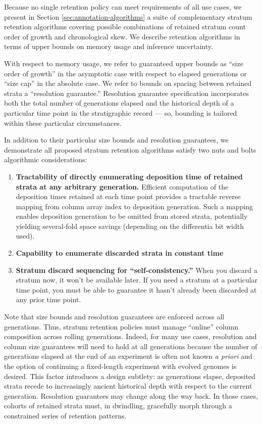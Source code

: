 Because no single retention policy can meet requirements of all use cases, we present in Section \ref{sec:annotation-algorithms} a suite of complementary stratum retention algorithms covering possible combinations of retained stratum count order of growth and chronological skew.
We describe retention algorithms in terms of upper bounds on memory usage and inference uncertainty.

With respect to memory usage, we refer to guaranteed upper bounds as ``size order of growth'' in the asymptotic case with respect to elapsed generations or ``size cap'' in the absolute case.
We refer to bounds on spacing between retained strata a ``resolution guarantee.''
Resolution guarantee specification incorporates both the total number of generations elapsed and the historical depth of a particular time point in the stratigraphic record --- so, bounding is tailored within these particular circumstances.

In addition to their particular size bounds and resolution guarantees, we demonstrate all proposed stratum retention algorithms satisfy two nuts and bolts algorithmic considerations:
\begin{enumerate}
\item \textbf{Tractability of directly enumerating deposition time of retained strata at any arbitrary generation.} Efficient computation of the deposition times retained at each time point provides a tractable reverse mapping from column array index to deposition generation.
  Such a mapping enables deposition generation to be omitted from stored strata, potentially yielding several-fold space savings (depending on the differentia bit width used).

\item \textbf{Capability to enumerate discarded strata in constant time}

\item \textbf{Stratum discard sequencing for ``self-consistency.''}
  When you discard a stratum now, it won't be available later.
  If you need a stratum at a particular time point, you must be able to guarantee it hasn't already been discarded at any prior time point.

\end{enumerate}

Note that size bounds and resolution guarantees are enforced across all generations.
Thus, stratum retention policies must manage ``online'' column composition across rolling generations.
Indeed, for many use cases, resolution and column size guarantees will need to hold at all generations because the number of generations elapsed at the end of an experiment is often not known \textit{a priori} and the option of continuing a fixed-length experiment with evolved genomes is desired.
This factor introduces a design subtlety: as generations elapse, deposited strata recede to increasingly ancient historical depth with respect to the current generation.
Resolution guarantees may change along the way back.
In those cases, cohorts of retained strata must, in dwindling, gracefully morph through a constrained series of retention patterns.
